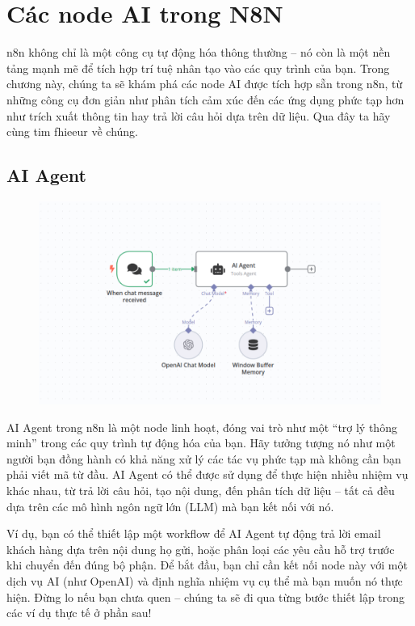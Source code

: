 \section{Các node AI trong N8N}
n8n không chỉ là một công cụ tự động hóa thông thường – nó còn là một nền tảng mạnh mẽ để tích hợp trí tuệ nhân tạo vào các quy trình của bạn. Trong chương này, chúng ta sẽ khám phá các node AI được tích hợp sẵn trong n8n, từ những công cụ đơn giản như phân tích cảm xúc đến các ứng dụng phức tạp hơn như trích xuất thông tin hay trả lời câu hỏi dựa trên dữ liệu. Qua đây ta hãy cùng tim fhieeur về chúng. 


\subsection{AI Agent}

\begin{figure}[htbp]
    \centering
    \includegraphics[width=1\linewidth]{Chap1-7/ai-intro01.pdf}
\end{figure}

AI Agent trong n8n là một node linh hoạt, đóng vai trò như một “trợ lý thông minh” trong các quy trình tự động hóa của bạn. Hãy tưởng tượng nó như một người bạn đồng hành có khả năng xử lý các tác vụ phức tạp mà không cần bạn phải viết mã từ đầu. AI Agent có thể được sử dụng để thực hiện nhiều nhiệm vụ khác nhau, từ trả lời câu hỏi, tạo nội dung, đến phân tích dữ liệu – tất cả đều dựa trên các mô hình ngôn ngữ lớn (LLM) mà bạn kết nối với nó.

Ví dụ, bạn có thể thiết lập một workflow để AI Agent tự động trả lời email khách hàng dựa trên nội dung họ gửi, hoặc phân loại các yêu cầu hỗ trợ trước khi chuyển đến đúng bộ phận. Để bắt đầu, bạn chỉ cần kết nối node này với một dịch vụ AI (như OpenAI) và định nghĩa nhiệm vụ cụ thể mà bạn muốn nó thực hiện. Đừng lo nếu bạn chưa quen – chúng ta sẽ đi qua từng bước thiết lập trong các ví dụ thực tế ở phần sau!



